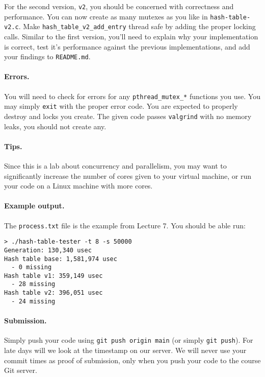 For the second version, \texttt{v2}, you should be concerned with correctness
and performance.
You can now create as many mutexes as you like in \texttt{hash-table-v2.c}.
Make \texttt{hash\_table\_v2\_add\_entry} thread safe by adding the proper
locking calls.
Similar to the first version, you'll need to explain why your implementation
is correct, test it's performance against the previous implementations, and
add your findings to \texttt{README.md}.

\paragraph{Errors.}

You will need to check for errors for any \texttt{pthread\_mutex\_*} functions
you use.
You may simply \texttt{exit} with the proper error code.
You are expected to properly destroy and locks you create.
The given code passes \texttt{valgrind} with no memory leaks, you should not
create any.

\paragraph{Tips.}

Since this is a lab about concurrency and parallelism, you may want to
significantly increase the number of cores given to your virtual machine, or
run your code on a Linux machine with more cores.

\paragraph{Example output.}

The \texttt{process.txt} file is the example from Lecture 7. You should be able
run:

\begin{lstlisting}
> ./hash-table-tester -t 8 -s 50000
Generation: 130,340 usec
Hash table base: 1,581,974 usec
  - 0 missing
Hash table v1: 359,149 usec
  - 28 missing
Hash table v2: 396,051 usec
  - 24 missing
\end{lstlisting}

\paragraph{Submission.}

Simply push your code using \lstinline|git push origin main| (or simply
\lstinline|git push|).
For late days will we look at the timestamp on our server.
We will never use your commit times as proof of submission, only when you
push your code to the course Git server.


